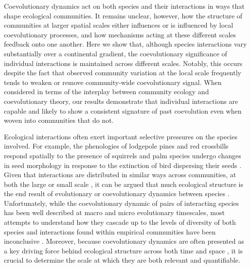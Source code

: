 Coevolutionary dynamics act on both species and their interactions in
ways that shape ecological communities. It remains unclear, however, how
the structure of communities at larger spatial scales either influences
or is influenced by local coevolutionary processes, and how mechanisms
acting at these different scales feedback onto one another. Here we show
that, although species interactions vary substantially over a
continental gradient, the coevolutionary significance of individual
interactions is maintained across different scales. Notably, this occurs
despite the fact that observed community variation at the local scale
frequently tends to weaken or remove community-wide coevolutionary
signal. When considered in terms of the interplay between community
ecology and coevolutionary theory, our results demonstrate that
individual interactions are capable and likely to show a consistent
signature of past coevolution even when woven into communities that do
not.

Ecological interactions often exert important selective pressures on the
species involved. For example, the phenologies of lodgepole pines and
red crossbills respond spatially to the presence of squirrels
\citep{benk03a} and palm species undergo changes in seed morphology in
response to the extinction of bird dispersing their seeds
\citep{gale13}. Given that interactions are distributed in similar ways
across communities, at both the large or small scale \citep{jord03}, it
can be argued that much ecological structure is the end result of
evolutionary or coevolutionary dynamics between species
\citep{eklo11, stou12}. Unfortunately, while the coevolutionary dynamic
of pairs of interacting species has been well described at macro
\citep{van73} and micro \citep{gand08} evolutionary timescales, most
attempts to understand how they cascade up to the levels of diversity of
both species and interactions found within empirical communities have
been inconclusive \citep{hemb14}. Moreover, because coevolutionary
dynamics are often presented as a key driving force behind ecological
structure across both time and space \citep{thom05}, it is crucial to
determine the scale at which they are both relevant and quantifiable.

